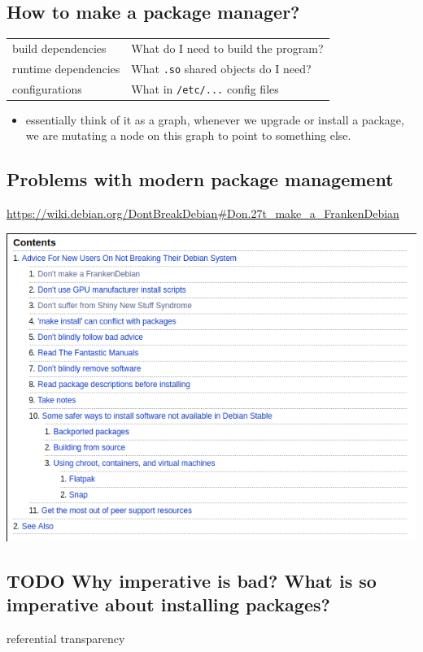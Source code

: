 \documentclass[11pt]{article}
\begin{document}
\subsection{How to make a package manager?}
\label{sec:orgb389177}
\begin{center}
\begin{tabular}{ll}
build dependencies & What do I need to build the program?\\
runtime dependencies & What \texttt{.so} shared objects do I need?\\
configurations & What in \texttt{/etc/...} config files\\
\end{tabular}
\end{center}
\begin{itemize}
\item essentially think of it as a graph, whenever we upgrade or install a package,
we are mutating a node on this graph to point to something else.
\end{itemize}
\subsection{Problems with modern package management}
\label{sec:org21030c9}
\url{https://wiki.debian.org/DontBreakDebian\#Don.27t\_make\_a\_FrankenDebian}
\begin{center}
\includegraphics[width=.9\linewidth]{./images/screenshot-01.png}
\end{center}
\subsection{{\bfseries\sffamily TODO} Why imperative is bad? What is so imperative about installing packages?}
\label{sec:org6f4a87c}
referential transparency
\end{document}
